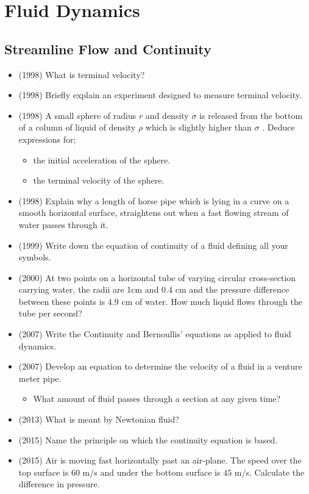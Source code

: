 \documentclass{article}
\begin{document}
\section{Fluid Dynamics}

\subsection{Streamline Flow and Continuity}
\begin{itemize}
\item (1998)  What is terminal velocity?
\item (1998)  Briefly explain an experiment designed to measure terminal velocity.
\item (1998)  A small sphere of radius $ r$ and density $ \sigma $ is released from the bottom of a column of liquid of density $ \rho $ which is slightly higher than $ \sigma $ . Deduce expressions for;\begin{itemize}
\item the initial acceleration of the sphere.
\item the terminal velocity of the sphere.
\end{itemize}
\item (1998)  Explain why a length of horse pipe which is lying in a curve on a smooth horizontal surface, straightens out when a fast flowing stream of water passes through it.
\item (1999)  Write down the equation of continuity of a fluid defining all your symbols.
\item (2000)  At two points on a horizontal tube of varying circular cross-section carrying water, the radii are 1cm and $ 0.4$ cm and the pressure difference between these points is $ 4.9$ cm of water. How much liquid flows through the tube per second?
\item (2007)  Write the Continuity and Bernoullis’ equations as applied to fluid dynamics. 
\item (2007)  Develop an equation to determine the velocity of a fluid in a venture meter pipe.\begin{itemize}
\item What amount of fluid passes through a section at any given time? 
\end{itemize}
\item (2013)  What is meant by Newtonian fluid? 
\item (2015)  Name the principle on which the continuity equation is based.
\item (2015)  Air is moving fast horizontally past an air-plane.  The speed over the top surface is $ 60$ m$/$s and under the bottom surface is $ 45$ m$/$s.  Calculate the difference in pressure.

\end{itemize}
\end{document}

